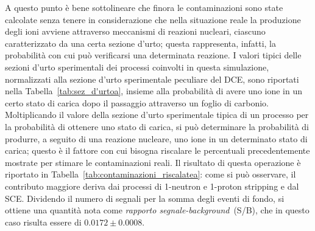 A questo punto è bene sottolineare che finora le contaminazioni sono state calcolate senza tenere in considerazione che nella situazione reale la produzione degli ioni avviene attraverso meccanismi di reazioni nucleari, ciascuno caratterizzato da una certa sezione d'urto; questa rappresenta, infatti, la probabilità con cui può verificarsi una determinata reazione.
I valori tipici delle sezioni d'urto sperimentali dei processi coinvolti in questa simulazione, normalizzati alla sezione d'urto sperimentale peculiare del DCE, sono riportati nella Tabella~\ref{tab:sez_d'urtoa}, insieme alla probabilità di avere uno ione in un certo stato di carica dopo il passaggio attraverso un foglio di carbonio.
Moltiplicando il valore della sezione d'urto sperimentale tipica di un processo per la probabilità di ottenere uno stato di carica, si può determinare la probabilità di produrre, a seguito di una reazione nucleare, uno ione in un determinato stato di carica;
questo è il fattore con cui bisogna riscalare le percentuali precedentemente mostrate per stimare le contaminazioni reali.
Il risultato di questa operazione è riportato in Tabella~\ref{tab:contaminazioni_riscalatea}: come si può osservare, il contributo maggiore deriva dai processi di 1-neutron e 1-proton stripping e dal SCE.
Dividendo il numero di segnali per la somma degli eventi di fondo, si ottiene una quantità nota come \emph{rapporto segnale-background}~(S/B), che in questo caso risulta essere di $0.0172 \pm 0.0008$.



